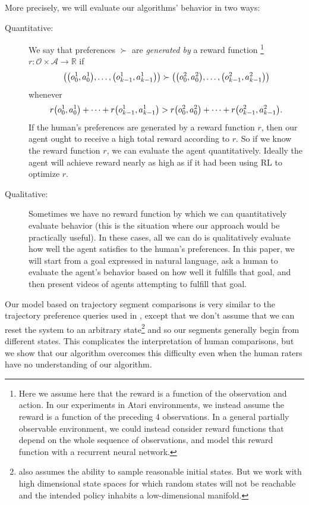 \documentclass{article}
\def\O{\mathcal{O}} %
\def\A{\mathcal{A}} %
\DeclarePairedDelimiter{\pdelims}{(}{)}
\newcommand{\of}[1]{\pdelims*{#1}}
\begin{document}
More precisely, we will evaluate our algorithms' behavior in two ways:

\begin{description}
\item[Quantitative:] We say that preferences $\succ$ are \emph{generated by} a reward function%
\footnote{Here we assume here that the reward is a function of the observation and action.
In our experiments in Atari environments, we instead assume the reward is a function of the preceding 4 observations.
In a general partially observable environment,
we could instead consider reward functions that depend on the whole sequence of observations,
and model this reward function with a recurrent neural network.}
$r : \O \times \A \rightarrow \mathbb{R}$
if
\[\of{\of{o^1_0, a_0^1},\ldots,\of{o^1_{k-1},a^1_{k-1}}} \succ \of{\of{o^2_{0}, a^2_{0}},\ldots,\of{o^2_{k-1},a^2_{k-1}}}\]
whenever
\[ r\of{o^1_0, a^1_0} + \cdots + r\of{o^1_{k-1}, a^1_{k-1}} > r\of{o^2_{0}, a^2_{0}} + \cdots + r\of{o^2_{k-1}, a^2_{k-1}}.\]
If the human's preferences are generated by a reward function $r$,
then our agent ought to receive a high total reward according to $r$.
So if we know the reward function $r$, we can evaluate the agent quantitatively.
Ideally the agent will achieve reward nearly as high as if it had been using RL to optimize $r$.
\item[Qualitative:] Sometimes we have no reward function by which we can quantitatively evaluate behavior (this is the situation where our approach would be practically useful).
In these cases, all we can do is qualitatively evaluate how well the agent satisfies to the human's preferences.
In this paper, we will start from a goal expressed in natural language,
ask a human to evaluate the agent's behavior based on how well it fulfills that goal,
and then present videos of agents attempting to fulfill that goal.
\end{description}

Our model based on trajectory segment comparisons
is very similar to the trajectory preference queries used in \citet{Wilson12},
except that we don't assume that we can reset the system to an arbitrary state\footnote{\citet{Wilson12} also assumes the ability to sample
reasonable initial states.
But we work with high dimensional state spaces for which random states
will not be reachable and the intended policy inhabits a low-dimensional manifold.}
and so our segments generally begin from different states.
This complicates the interpretation of human comparisons,
but we show that our algorithm overcomes this difficulty even when the human
raters have no understanding of our algorithm.
\end{document}
